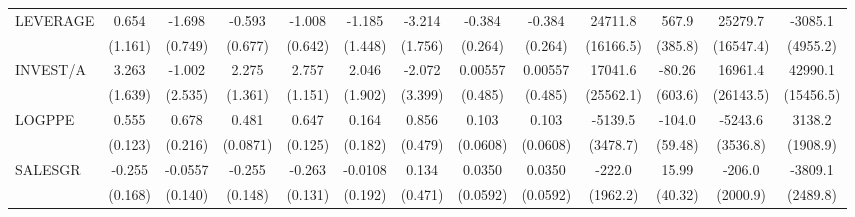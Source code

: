 \begin{table}[htbp]
\begin{tabular}{l*{12}{c}}
LEVERAGE            &       0.654         &      -1.698\sym{**} &      -0.593         &      -1.008         &      -1.185         &      -3.214\sym{*}  &      -0.384         &      -0.384         &     24711.8         &       567.9         &     25279.7         &     -3085.1         \\
                    &     (1.161)         &     (0.749)         &     (0.677)         &     (0.642)         &     (1.448)         &     (1.756)         &     (0.264)         &     (0.264)         &   (16166.5)         &     (385.8)         &   (16547.4)         &    (4955.2)         \\
INVEST/A            &       3.263\sym{*}  &      -1.002         &       2.275         &       2.757\sym{**} &       2.046         &      -2.072         &     0.00557         &     0.00557         &     17041.6         &      -80.26         &     16961.4         &     42990.1\sym{**} \\
                    &     (1.639)         &     (2.535)         &     (1.361)         &     (1.151)         &     (1.902)         &     (3.399)         &     (0.485)         &     (0.485)         &   (25562.1)         &     (603.6)         &   (26143.5)         &   (15456.5)         \\
LOGPPE              &       0.555\sym{***}&       0.678\sym{***}&       0.481\sym{***}&       0.647\sym{***}&       0.164         &       0.856         &       0.103         &       0.103         &     -5139.5         &      -104.0         &     -5243.6         &      3138.2         \\
                    &     (0.123)         &     (0.216)         &    (0.0871)         &     (0.125)         &     (0.182)         &     (0.479)         &    (0.0608)         &    (0.0608)         &    (3478.7)         &     (59.48)         &    (3536.8)         &    (1908.9)         \\
SALESGR             &      -0.255         &     -0.0557         &      -0.255         &      -0.263\sym{*}  &     -0.0108         &       0.134         &      0.0350         &      0.0350         &      -222.0         &       15.99         &      -206.0         &     -3809.1         \\
                    &     (0.168)         &     (0.140)         &     (0.148)         &     (0.131)         &     (0.192)         &     (0.471)         &    (0.0592)         &    (0.0592)         &    (1962.2)         &     (40.32)         &    (2000.9)         &    (2489.8)         \\

\end{tabular}
\end{table}
